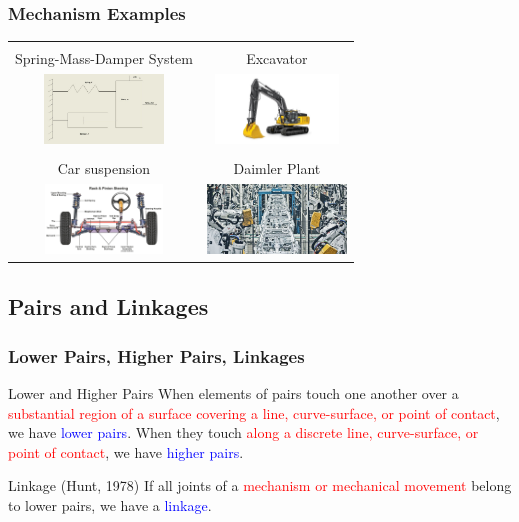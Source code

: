 \begin{frame}
	\frametitle{Mechanism Examples}
	\begin{tabular}{|c|c|} 
		\hline  \\
		Spring-Mass-Damper System & Excavator \\
		\includegraphics[height=5em,width=10em]{figures/spring-mass-damper.jpg} & 
		\includegraphics[height=5em,width=10em]{figures/excavJohnDeere.jpg} \\
		\hline \\
		Car suspension & Daimler  Plant \\
		\includegraphics[height=5em,width=10em]{figures/carsusp.jpg} &
		\includegraphics[height=5em,width=10em]{figures/daimler_manuf.jpeg} \\
		\hline
	\end{tabular}
\end{frame}

\subsection{Pairs and Linkages}
\begin{frame}
	\frametitle{Lower Pairs, Higher Pairs, Linkages}
	\begin{block}{Lower and Higher Pairs}
		When elements of pairs touch one another over a \textcolor{red}{substantial region of a surface covering a line, curve-surface, or point of contact}, we have \textcolor{blue}{lower pairs}. When they touch \textcolor{red}{along a discrete line, curve-surface, or point of contact}, we have \textcolor{blue}{higher pairs}.
	\end{block}
	\begin{block}{Linkage (Hunt, 1978)}
		If all joints of a \textcolor{red}{mechanism or mechanical movement} belong to lower pairs, we have a \textcolor{blue}{linkage}. 
	\end{block}
\end{frame}

